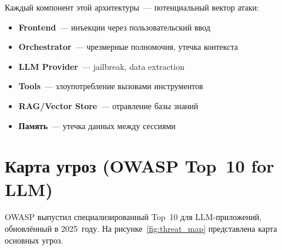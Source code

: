 \documentclass[12pt,a4paper]{article}
\begin{document}
Каждый компонент этой архитектуры~--- потенциальный вектор атаки:
\begin{itemize}
  \item \textbf{Frontend}~--- инъекции через пользовательский ввод
  \item \textbf{Orchestrator}~--- чрезмерные полномочия, утечка контекста
  \item \textbf{LLM Provider}~--- jailbreak, data extraction
  \item \textbf{Tools}~--- злоупотребление вызовами инструментов
  \item \textbf{RAG/Vector Store}~--- отравление базы знаний
  \item \textbf{Память}~--- утечка данных между сессиями
\end{itemize}


\section{Карта угроз (OWASP Top~10 for LLM)}

OWASP выпустил специализированный Top~10 для LLM-приложений, обновлённый в 2025~году. На рисунке~\ref{fig:threat_map} представлена карта основных угроз.
\end{document}
